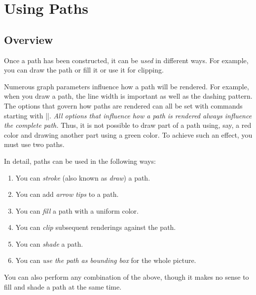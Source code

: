 %
%
%


\section{Using Paths}

\subsection{Overview}

Once a path has been constructed, it can be \emph{used} in different ways. For
example, you can draw the path or fill it or use it for clipping.

Numerous graph parameters influence how a path will be rendered. For example,
when you draw a path, the line width is important as well as the dashing
pattern. The options that govern how paths are rendered can all be set with
commands starting with |\pgfset|. \emph{All options that influence how a path
is rendered always influence the complete path.} Thus, it is not possible to
draw part of a path using, say, a red color and drawing another part using a
green color. To achieve such an effect, you must use two paths.

In detail, paths can be used in the following ways:
%
\begin{enumerate}
    \item You can \emph{stroke} (also known as \emph{draw}) a path.
    \item You can add \emph{arrow tips} to a path.
    \item You can \emph{fill} a path with a uniform color.
    \item You can \emph{clip} subsequent renderings against the path.
    \item You can \emph{shade} a path.
    \item You can \emph{use the path as bounding box} for the whole picture.
\end{enumerate}
%
You can also perform any combination of the above, though it makes no sense to
fill and shade a path at the same time.

